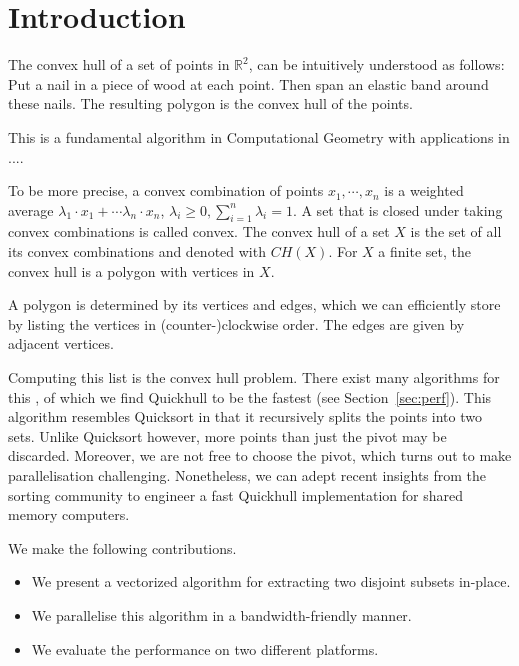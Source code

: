 \section{Introduction}

The convex hull of a set of points in $\mathbb{R}^2$, can be intuitively 
understood as follows: Put a nail in a piece of wood at each point. Then span 
an elastic band around these nails. The resulting polygon is the convex hull of 
the points.

This is a fundamental algorithm in Computational Geometry with applications
in .... 

To be more precise, a convex combination of points $x_1, \cdots, x_n$ is a 
weighted average $\lambda_1 \cdot x_1 + \cdots \lambda_n \cdot x_n$, 
$\lambda_i \geq 0, \sum_{i = 1}^n \lambda_i = 1$. A set that is closed under
taking convex combinations is called convex. The convex hull of a set $X$ is
the set of all its convex combinations and denoted with $CH(X)$. For $X$
a finite set, the convex hull is a polygon with vertices in $X$.

A polygon is determined by its vertices and edges, which we can efficiently
store by listing the vertices in (counter-)clockwise order. The edges are given 
by adjacent vertices.

Computing this list is the convex hull problem. There exist many algorithms for 
this \cite{}, of which we find Quickhull to be the fastest (see
Section~\ref{sec:perf}). This algorithm resembles Quicksort in that
it recursively splits the points into two sets. Unlike Quicksort however,
more points than just the pivot may be discarded. Moreover, we are not
free to choose the pivot, which turns out to make parallelisation challenging.
Nonetheless, we can adept recent insights from the sorting community to engineer
a fast Quickhull implementation for shared memory computers.

We make the following contributions.

\begin{itemize}
    \item We present a vectorized algorithm for extracting two disjoint
          subsets in-place.
    \item We parallelise this algorithm in a bandwidth-friendly manner.
    \item We evaluate the performance on two different platforms. 
\end{itemize}
